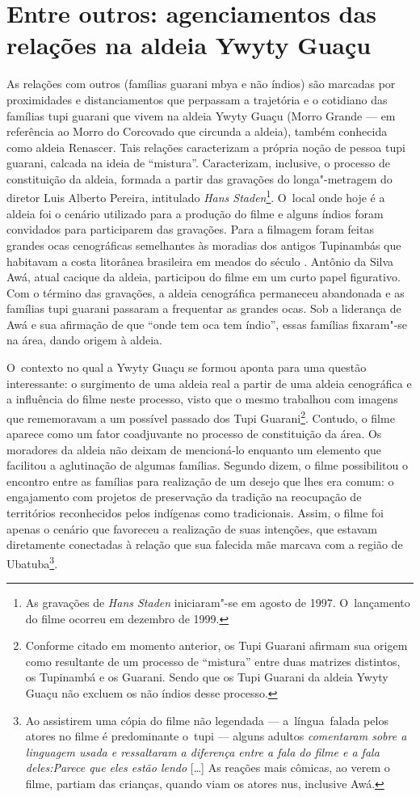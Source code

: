 \section{Entre outros: agenciamentos das relações na aldeia Ywyty Guaçu} 

As relações com outros (famílias guarani mbya e não índios) são marcadas
por proximidades e distanciamentos que perpassam a trajetória e o
cotidiano das famílias tupi guarani que vivem na aldeia Ywyty Guaçu
(Morro Grande --- em referência ao Morro do Corcovado que circunda a
aldeia), também conhecida como aldeia Renascer. Tais relações
caracterizam a própria noção de pessoa tupi guarani, calcada na ideia
de ``mistura''. Caracterizam, inclusive, o processo de constituição da
aldeia, formada a partir das gravações do longa"-metragem do diretor
Luis Alberto Pereira, intitulado \emph{Hans Staden}\footnote{As gravações de
\emph{Hans Staden} iniciaram"-se em agosto de 1997. O~lançamento do filme
ocorreu em dezembro de 1999.}. O~local onde hoje é a aldeia foi o
cenário utilizado para a produção do filme e alguns índios foram
convidados para participarem das gravações. Para a filmagem foram
feitas grandes ocas cenográficas semelhantes às moradias dos antigos
Tupinambás que habitavam a costa litorânea brasileira em meados do
século . Antônio da Silva Awá, atual cacique da aldeia, participou
do filme em um curto papel figurativo. Com o término das gravações, a
aldeia cenográfica permaneceu abandonada e as famílias tupi guarani
passaram a frequentar as grandes ocas. Sob a liderança de Awá e sua
afirmação de que ``onde tem oca tem índio'', essas famílias fixaram"-se na
área, dando origem à aldeia.

O~contexto no qual a Ywyty Guaçu se formou aponta para uma questão
interessante: o surgimento de uma aldeia real a partir de uma aldeia
cenográfica e a influência do filme neste processo, visto que o mesmo
trabalhou com imagens que rememoravam a um possível passado dos Tupi
Guarani\footnote{Conforme citado em momento anterior, os Tupi Guarani
afirmam sua origem como resultante de um processo de ``mistura'' entre duas
matrizes distintos, os Tupinambá e os Guarani. Sendo que os Tupi
Guarani da aldeia Ywyty Guaçu não excluem os não índios desse
processo.}. Contudo, o filme aparece como um fator coadjuvante no
processo de constituição da área. Os moradores da aldeia não deixam de
mencioná-lo enquanto um elemento que facilitou a aglutinação de algumas
famílias. Segundo dizem, o filme possibilitou o encontro entre as
famílias para realização de um desejo que lhes era comum: o engajamento
com projetos de preservação da tradição na reocupação de territórios
reconhecidos pelos indígenas como tradicionais. Assim, o filme foi
apenas o cenário que favoreceu a realização de suas intenções, que
estavam diretamente conectadas à relação que sua falecida mãe marcava
com a região de Ubatuba\footnote{Ao assistirem uma cópia do filme não
legendada --- a~língua~falada pelos atores no filme é predominante o~tupi
--- alguns adultos \emph{comentaram sobre a linguagem usada e ressaltaram
a diferença entre a fala do filme e a fala deles:}\emph{Parece que
eles estão lendo} [\ldots{}] As reações mais cômicas, ao verem o filme, partiam
das crianças, quando viam os atores nus, inclusive Awá.}.

